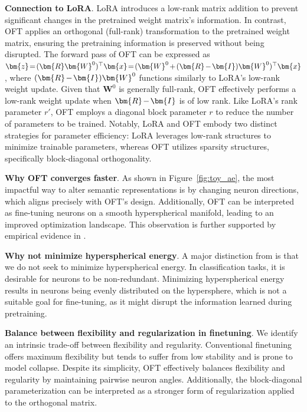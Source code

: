 \textbf{Connection to LoRA}. LoRA introduces a low-rank matrix addition to prevent significant changes in the pretrained weight matrix's information. In contrast, OFT applies an orthogonal (full-rank) transformation to the pretrained weight matrix, ensuring the pretraining information is preserved without being disrupted. The forward pass of OFT can be expressed as $\thickmuskip=2mu \medmuskip=2mu \bm{z}=(\bm{R}\bm{W}^0)^\top\bm{x}=(\bm{W}^0+(\bm{R}-\bm{I})\bm{W}^0)^\top\bm{x}$, where $\thickmuskip=2mu \medmuskip=2mu (\bm{R}-\bm{I})\bm{W}^0$ functions similarly to LoRA's low-rank weight update. Given that $\bm{W}^0$ is generally full-rank, OFT effectively performs a low-rank weight update when $\thickmuskip=2mu \medmuskip=2mu \bm{R}-\bm{I}$ is of low rank. Like LoRA's rank parameter $r'$, OFT employs a diagonal block parameter $r$ to reduce the number of parameters to be trained. Notably, LoRA and OFT embody two distinct strategies for parameter efficiency: LoRA leverages low-rank structures to minimize trainable parameters, whereas OFT utilizes sparsity structures, specifically block-diagonal orthogonality.

\textbf{Why OFT converges faster}. As shown in Figure~\ref{fig:toy_ae}, the most impactful way to alter semantic representations is by changing neuron directions, which aligns precisely with OFT's design. Additionally, OFT can be interpreted as fine-tuning neurons on a smooth hyperspherical manifold, leading to an improved optimization landscape. This observation is further supported by empirical evidence in \cite{liu2021orthogonal}.

\textbf{Why not minimize hyperspherical energy}. A major distinction from \cite{liu2021orthogonal} is that we do not seek to minimize hyperspherical energy. In classification tasks, it is desirable for neurons to be non-redundant. Minimizing hyperspherical energy results in neurons being evenly distributed on the hypersphere, which is not a suitable goal for fine-tuning, as it might disrupt the information learned during pretraining.

\textbf{Balance between flexibility and regularization in finetuning}. We identify an intrinsic trade-off between flexibility and regularity. Conventional finetuning offers maximum flexibility but tends to suffer from low stability and is prone to model collapse. Despite its simplicity, OFT effectively balances flexibility and regularity by maintaining pairwise neuron angles. Additionally, the block-diagonal parameterization can be interpreted as a stronger form of regularization applied to the orthogonal matrix.

